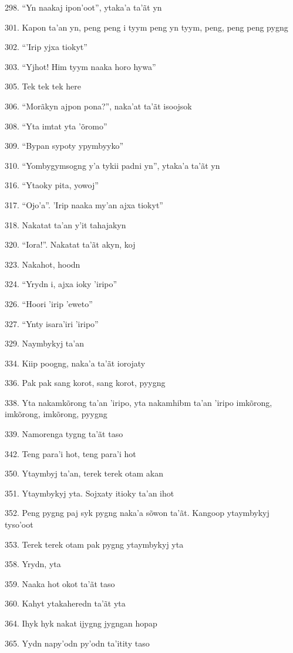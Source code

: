 298. ``Yn naakaj ipon'oot'', ytaka'a ta'ãt yn

301. Kapon ta'an yn, peng peng i tyym peng yn tyym, peng, peng peng pygng

302. ``'Irip yjxa tiokyt''

303. ``Yjhot! Him tyym naaka horo hywa''

305. Tek tek tek here

306. ``Morãkyn ajpon pona?'', naka'at ta'ãt isoojsok

308. ``Yta imtat yta 'õromo''

309. ``Bypan sypoty ypymbyyko''

310. ``Yombygymsogng y'a tykii padni yn'', ytaka'a ta'ãt yn

316. ``Ytaoky pita, yowoj''

317. ``Ojo'a''. 'Irip naaka my'an ajxa tiokyt''

318. Nakatat ta'an y'it tahajakyn

320. ``Iora!''. Nakatat ta'ãt akyn, koj

323. Nakahot, hoodn

324. ``Yrydn i, ajxa ioky 'iripo''

326. ``Hoori 'irip 'eweto''

327. ``Ynty isara'iri 'iripo''

329. Naymbykyj ta'an

334. Kiip poogng, naka'a ta'ãt iorojaty

336. Pak pak sang korot, sang korot, pyygng

338. Yta nakamkõrong ta'an 'iripo, yta nakamhibm ta'an 'iripo imkõrong,
imkõrong, imkõrong, pyygng

339. Namorenga tygng ta'ãt taso

342. Teng para'i hot, teng para'i hot

350. Ytaymbyj ta'an, terek terek otam akan

351. Ytaymbykyj yta. Sojxaty itioky ta'an ihot

352. Peng pygng paj syk pygng naka'a sõwon ta'ãt. Kangoop ytaymbykyj tyso'oot

353. Terek terek otam pak pygng ytaymbykyj yta

358. Yrydn, yta

359. Naaka hot okot ta'ãt taso

360. Kahyt ytakaheredn ta'ãt yta

364. Ihyk hyk nakat ijygng jygngan hopap

365. Yydn napy'odn py'odn ta'itity taso

